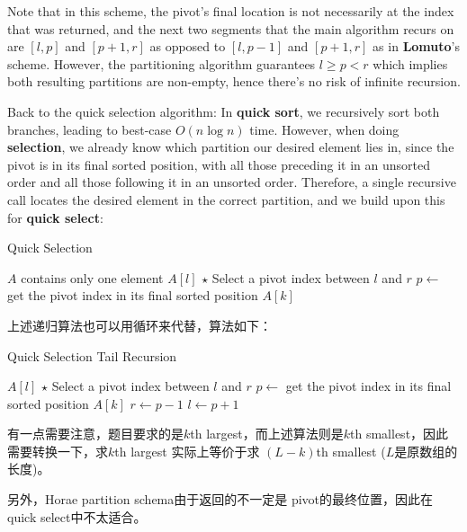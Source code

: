\par
Note that in this scheme, the pivot's final location is not necessarily at the index that was returned, and the next two segments that the main algorithm recurs on are $[l, p]$ and $[p+1, r]$ as opposed to $[l, p-1]$ and $[p+1, r]$ as in \textbf{Lomuto}'s scheme. However, the partitioning algorithm guarantees $l\geq p < r$ which implies both resulting partitions are non-empty, hence there's no risk of infinite recursion.
\par
Back to the quick selection algorithm: In \textbf{quick sort}, we recursively sort both branches, leading to best-case $O(n \log n)$ time. However, when doing \textbf{selection}, we already know which partition our desired element lies in, since the pivot is in its final sorted position, with all those preceding it in an unsorted order and all those following it in an unsorted order. Therefore, a single recursive call locates the desired element in the correct partition, and we build upon this for \textbf{quick select}:
\begin{algorithm}[H]
\caption{Quick Selection}
\begin{algorithmic}[1]
 \Comment $A$ contains only one element
\State \Return $A[l]$
\EndIf
\State $\star$ Select a pivot index between $l$ and $r$
\State $p\gets$  \Comment get the pivot index in its final sorted position
\State \Return $A[k]$
\State \Return {}
\Else
\State \Return {}
\EndIf
\EndProcedure
\end{algorithmic}
\end{algorithm}
\begin{CJK*}{UTF8}{gbsn}
上述递归算法也可以用循环来代替，算法如下：
\end{CJK*}
\setcounter{algorithm}{0}
\begin{algorithm}[H]
\caption{Quick Selection Tail Recursion}
\begin{algorithmic}[1]
\Loop
{}
\State \Return $A[l]$
\EndIf
\State $\star$ Select a pivot index between $l$ and $r$
\State $p\gets$  \Comment get the pivot index in its final sorted position
\State \Return $A[k]$
\State $r\gets p-1$
\Else
\State $l\gets p+1$
\EndIf
\EndLoop
\EndProcedure
\end{algorithmic}
\end{algorithm}
\begin{CJK*}{UTF8}{gbsn}
有一点需要注意，题目要求的是$k$th largest，而上述算法则是$k$th smallest，因此需要转换一下，求$k$th largest 实际上等价于求 $(L-k)$th smallest ($L$是原数组的长度)。
\par
另外，Horae partition schema由于返回的不一定是 pivot的最终位置，因此在quick select中不太适合。
\end{CJK*}
